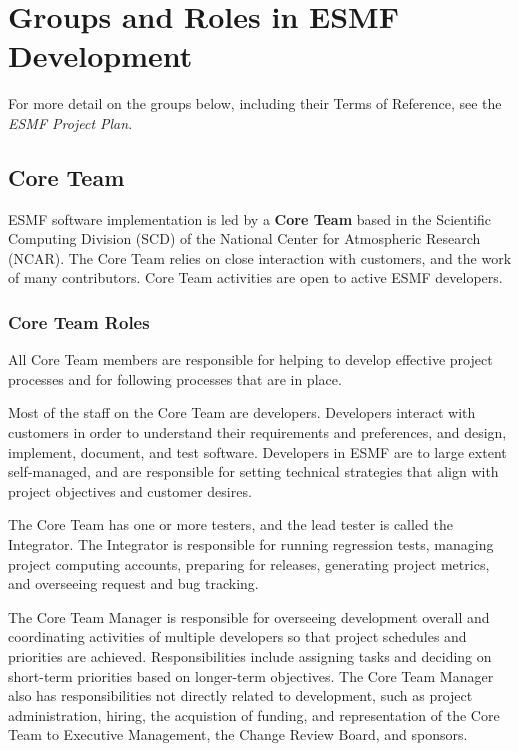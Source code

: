 
\section{Groups and Roles in ESMF Development}

For more detail on the groups below, including their Terms of
Reference, see the {\it ESMF Project Plan}.

\subsection{Core Team}
ESMF software implementation is led by a {\bf Core Team} based in the 
Scientific Computing Division (SCD) of the National Center for
Atmospheric Research (NCAR).  The Core Team relies on close interaction
with customers, and the work of many contributors.  Core Team
activities are open to active ESMF developers.

\subsubsection{Core Team Roles}
All Core Team members are responsible for helping to 
develop effective project processes and for following
processes that are in place.

Most of the staff on the Core Team are developers.  Developers
interact with customers in order to understand
their requirements and preferences, and design, implement,
document, and test software.  Developers in ESMF are to large
extent self-managed, and are responsible for setting
technical strategies that align with project objectives
and customer desires.

The Core Team has one or more testers, and the lead tester is called
the Integrator.  The Integrator is responsible for running regression
tests, managing project computing accounts, preparing for releases,
generating project metrics, and overseeing request and bug tracking.

The Core Team Manager is responsible for overseeing development
overall and coordinating activities of multiple developers
so that project schedules and priorities are achieved.
Responsibilities include assigning tasks and deciding on
short-term priorities based on longer-term objectives.  The
Core Team Manager also has responsibilities not directly
related to development, such as project administration,
hiring, the acquistion of funding, and representation of 
the Core Team to Executive Management, the Change Review 
Board, and sponsors.

